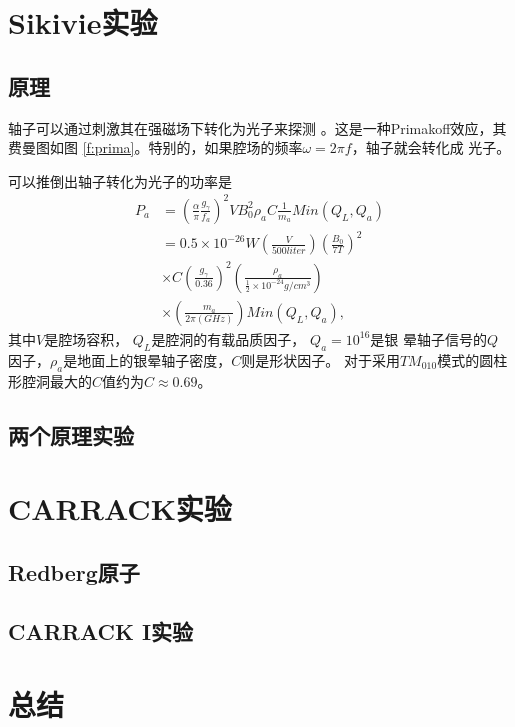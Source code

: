\documentclass[twocolumn,12pt,a4paper]{article}
\begin{document}
\section{Sikivie实验}
\subsection{原理}
轴子可以通过刺激其在强磁场下转化为光子来探测
\cite{sikivie83a}\cite{sikivie85}。这是一种Primakoff效应，其费曼图如图
\ref{f:prima}。特别的，如果腔场的频率$\omega = 2\pi f$，轴子就会转化成
光子。\par
可以推倒出\cite{sikivie85}轴子转化为光子的功率是
\begin{equation}
  \label{m:pocov}
  \begin{split}
    P_a &= (\frac{\alpha}{\pi} \frac{g_\gamma}{f_a})^2 V B_0^2 \rho_a C \frac{1}{m_a} Min(Q_L,Q_a)\\
    &= 0.5\times10^{-26}W(\frac{V}{500 liter})(\frac{B_0}{7 T})^2 \\
    &\times  C (\frac{g_\gamma}{0.36})^2(\frac{\rho_a}{\frac{1}{2}\times10^{-24}g/cm^3})\\
    &\times (\frac{m_a}{2\pi(GHz)})Min(Q_L,Q_a),
\end{split}
\end{equation}
其中$V$是腔场容积， $Q_L$是腔洞的有载品质因子， $Q_a = 10^{16}$是银
晕轴子信号的$Q$因子，$\rho_a$是地面上的银晕轴子密度，$C$则是形状因子。
对于采用$TM_{010}$模式的圆柱形腔洞最大的$C$值约为$C \approx 0.69$。
\subsection{两个原理实验}

\section{CARRACK实验}
\subsection{Redberg原子}
\subsection{CARRACK I实验}

\section{总结}

\medskip
\balance
\renewcommand{\refname}{参考文献}
\printbibliography
\end{document}
